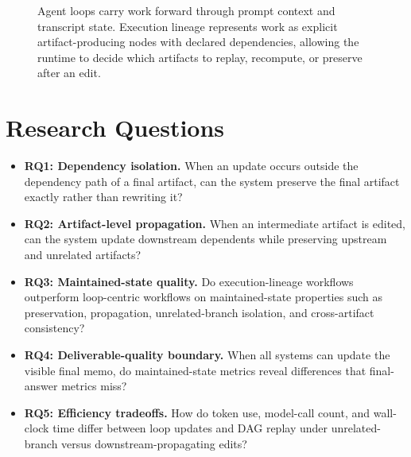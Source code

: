 \documentclass{article}
\begin{document}
\begin{figure}[H]
\caption{Agent loops carry work forward through prompt context and transcript state. Execution lineage represents work as explicit artifact-producing nodes with declared dependencies, allowing the runtime to decide which artifacts to replay, recompute, or preserve after an edit.}
\label{fig:loop-vs-dag}
\end{figure}

\section{Research Questions}

\begin{itemize}
\item \textbf{RQ1: Dependency isolation.} When an update occurs outside the dependency path of a final artifact, can the system preserve the final artifact exactly rather than rewriting it?
\item \textbf{RQ2: Artifact-level propagation.} When an intermediate artifact is edited, can the system update downstream dependents while preserving upstream and unrelated artifacts?
\item \textbf{RQ3: Maintained-state quality.} Do execution-lineage workflows outperform loop-centric workflows on maintained-state properties such as preservation, propagation, unrelated-branch isolation, and cross-artifact consistency?
\item \textbf{RQ4: Deliverable-quality boundary.} When all systems can update the visible final memo, do maintained-state metrics reveal differences that final-answer metrics miss?
\item \textbf{RQ5: Efficiency tradeoffs.} How do token use, model-call count, and wall-clock time differ between loop updates and DAG replay under unrelated-branch versus downstream-propagating edits?
\end{itemize}
\end{document}
